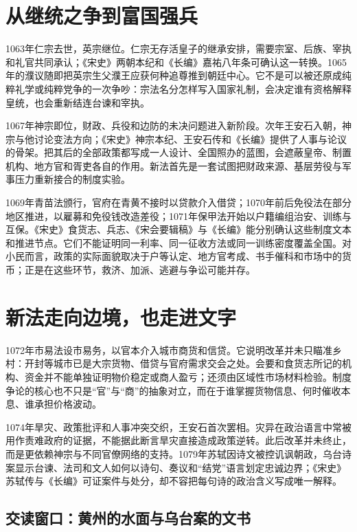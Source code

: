 \section{从继统之争到富国强兵}

1063年仁宗去世，英宗继位。仁宗无存活皇子的继承安排，需要宗室、后族、宰执和礼官共同承认；《宋史》两朝本纪和《长编》嘉祐八年条可确认这一转换。1065年的濮议随即把英宗生父濮王应获何种追尊推到朝廷中心。它不是可以被还原成纯粹礼学或纯粹党争的一次争吵：宗法名分怎样写入国家礼制，会决定谁有资格解释皇统，也会重新结连台谏和宰执。

1067年神宗即位，财政、兵役和边防的未决问题进入新阶段。次年王安石入朝，神宗与他讨论变法方向；《宋史》神宗本纪、王安石传和《长编》提供了人事与论议的骨架。把其后的全部政策都写成一人设计、全国照办的蓝图，会遮蔽皇帝、制置机构、地方官和胥吏各自的作用。新法首先是一套试图把财政来源、基层劳役与军事压力重新接合的制度实验。

1069年青苗法颁行，官府在青黄不接时以贷款介入借贷；1070年前后免役法在部分地区推进，以雇募和免役钱改造差役；1071年保甲法开始以户籍编组治安、训练与互保。《宋史》食货志、兵志、《宋会要辑稿》与《长编》能分别确认这些制度文本和推进节点。它们不能证明同一利率、同一征收方法或同一训练密度覆盖全国。对小民而言，政策的实际面貌取决于户等认定、地方官考成、书手催科和市场中的货币；正是在这些环节，救济、加派、逃避与争讼可能并存。

\section{新法走向边境，也走进文字}

1072年市易法设市易务，以官本介入城市商货和信贷。它说明改革并未只瞄准乡村：开封等城市已是大宗货物、借贷与官府需求交会之处。会要和食货志所记的机构、资金并不能单独证明物价稳定或商人盈亏；还须由区域性市场材料检验。制度争论的核心也不只是“官”与“商”的抽象对立，而在于谁掌握货物信息、何时催收本息、谁承担价格波动。

1074年旱灾、政策批评和人事冲突交织，王安石首次罢相。灾异在政治语言中常被用作责难政府的证据，不能据此断言旱灾直接造成政策逆转。此后改革并未终止，而是更依赖神宗与不同官僚网络的支持。1079年苏轼因诗文被控讥讽朝政，乌台诗案显示台谏、法司和文人如何以诗句、奏议和“结党”语言划定忠诚边界；《宋史》苏轼传与《长编》可证案件与处分，却不容把每句诗的政治含义写成唯一解释。

\subsection{交读窗口：黄州的水面与乌台案的文书}

